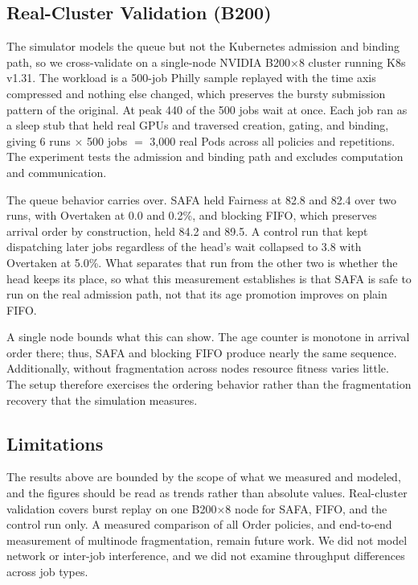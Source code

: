 \documentclass{ieeetj}
\begin{document}
\subsection{Real-Cluster Validation (B200)}\label{eval:b200}
The simulator models the queue but not the Kubernetes admission and binding path, so we cross-validate on a single-node NVIDIA B200$\times$8 cluster running K8s v1.31. The workload is a 500-job Philly sample replayed with the time axis compressed and nothing else changed, which preserves the bursty submission pattern of the original. At peak 440 of the 500 jobs wait at once. Each job ran as a sleep stub that held real GPUs and traversed creation, gating, and binding, giving 6 runs $\times$ 500 jobs $=$ 3{,}000 real Pods across all policies and repetitions. The experiment tests the admission and binding path and excludes computation and communication.

The queue behavior carries over. SAFA held Fairness at 82.8 and 82.4 over two runs, with Overtaken at 0.0 and 0.2\%, and blocking FIFO, which preserves arrival order by construction, held 84.2 and 89.5. A control run that kept dispatching later jobs regardless of the head's wait collapsed to 3.8 with Overtaken at 5.0\%. What separates that run from the other two is whether the head keeps its place, so what this measurement establishes is that SAFA is safe to run on the real admission path, not that its age promotion improves on plain FIFO.

A single node bounds what this can show. The age counter is monotone in arrival order there; thus, SAFA and blocking FIFO produce nearly the same sequence. Additionally, without fragmentation across nodes resource fitness varies little. The setup therefore exercises the ordering behavior rather than the fragmentation recovery that the simulation measures.

\subsection{Limitations}\label{eval:threats}
The results above are bounded by the scope of what we measured and modeled, and the figures should be read as trends rather than absolute values. Real-cluster validation covers burst replay on one B200$\times$8 node for SAFA, FIFO, and the control run only. A measured comparison of all Order policies, and end-to-end measurement of multinode fragmentation, remain future work. We did not model network or inter-job interference, and we did not examine throughput differences across job types.
\end{document}
